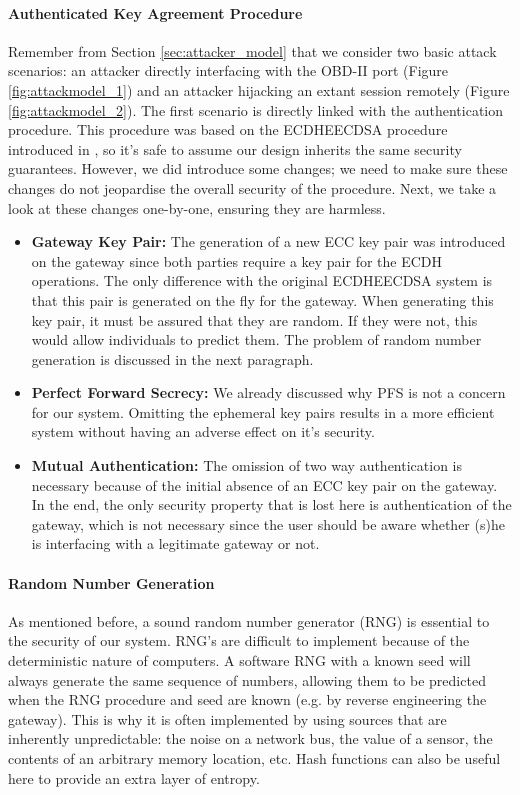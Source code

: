 \paragraph{Authenticated Key Agreement Procedure}
Remember from Section \ref{sec:attacker_model} that we consider two basic attack scenarios: an attacker directly interfacing with the OBD-II port (Figure \ref{fig:attackmodel_1}) and an attacker hijacking an extant session remotely (Figure \ref{fig:attackmodel_2}). The first scenario is directly linked with the authentication procedure. This procedure was based on the ECDHE\textunderscore ECDSA procedure introduced in \cite{RFC4492}, so it's safe to assume our design inherits the same security guarantees. However, we did introduce some changes; we need to make sure these changes do not jeopardise the overall security of the procedure. Next, we take a look at these changes one-by-one, ensuring they are harmless.
\begin{itemize}
	\item \textbf{Gateway Key Pair:} The generation of a new ECC key pair was introduced on the gateway since both parties require a key pair for the ECDH operations. The only difference with the original ECDHE\textunderscore ECDSA system is that this pair is generated on the fly for the gateway. When generating this key pair, it must be assured that they are random. If they were not, this would allow individuals to predict them. The problem of random number generation is discussed in the next paragraph.
	
	\item \textbf{Perfect Forward Secrecy:} We already discussed why PFS is not a concern for our system. Omitting the ephemeral key pairs results in a more efficient system without having an adverse effect on it's security.
	
	\item \textbf{Mutual Authentication:} The omission of two way authentication is necessary because of the initial absence of an ECC key pair on the gateway. In the end, the only security property that is lost here is authentication of the gateway, which is not necessary since the user should be aware whether (s)he is interfacing with a legitimate gateway or not.
\end{itemize} 

\paragraph{Random Number Generation} As mentioned before, a sound random number generator (RNG) is essential to the security of our system. RNG's are difficult to implement because of the deterministic nature of computers. A software RNG with a known seed will always generate the same sequence of numbers, allowing them to be predicted when the RNG procedure and seed are known (e.g. by reverse engineering the gateway). This is why it is often implemented by using sources that are inherently unpredictable: the noise on a network bus, the value of a sensor, the contents of an arbitrary memory location, etc. Hash functions can also be useful here to provide an extra layer of entropy. 

